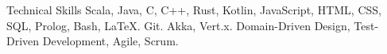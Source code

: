 
\begin{rubric}{Technical Skills}
	Scala, Java, C, C++, Rust, Kotlin, JavaScript, HTML, CSS, SQL, Prolog, Bash, LaTeX.
	Git.
	Akka, Vert.x.
	Domain-Driven Design, Test-Driven Development, Agile, Scrum.
\end{rubric}
